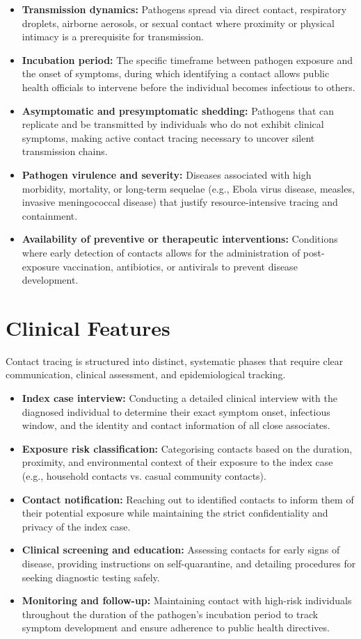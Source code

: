 \begin{itemize}
    \item \textbf{Transmission dynamics:} Pathogens spread via direct contact, respiratory droplets, airborne aerosols, or sexual contact where proximity or physical intimacy is a prerequisite for transmission.
    \item \textbf{Incubation period:} The specific timeframe between pathogen exposure and the onset of symptoms, during which identifying a contact allows public health officials to intervene before the individual becomes infectious to others.
    \item \textbf{Asymptomatic and presymptomatic shedding:} Pathogens that can replicate and be transmitted by individuals who do not exhibit clinical symptoms, making active contact tracing necessary to uncover silent transmission chains.
    \item \textbf{Pathogen virulence and severity:} Diseases associated with high morbidity, mortality, or long-term sequelae (e.g., Ebola virus disease, measles, invasive meningococcal disease) that justify resource-intensive tracing and containment.
    \item \textbf{Availability of preventive or therapeutic interventions:} Conditions where early detection of contacts allows for the administration of post-exposure vaccination, antibiotics, or antivirals to prevent disease development.
\end{itemize}

\section*{Clinical Features}
Contact tracing is structured into distinct, systematic phases that require clear communication, clinical assessment, and epidemiological tracking.

\begin{itemize}
    \item \textbf{Index case interview:} Conducting a detailed clinical interview with the diagnosed individual to determine their exact symptom onset, infectious window, and the identity and contact information of all close associates.
    \item \textbf{Exposure risk classification:} Categorising contacts based on the duration, proximity, and environmental context of their exposure to the index case (e.g., household contacts vs. casual community contacts).
    \item \textbf{Contact notification:} Reaching out to identified contacts to inform them of their potential exposure while maintaining the strict confidentiality and privacy of the index case.
    \item \textbf{Clinical screening and education:} Assessing contacts for early signs of disease, providing instructions on self-quarantine, and detailing procedures for seeking diagnostic testing safely.
    \item \textbf{Monitoring and follow-up:} Maintaining contact with high-risk individuals throughout the duration of the pathogen's incubation period to track symptom development and ensure adherence to public health directives.
\end{itemize}

